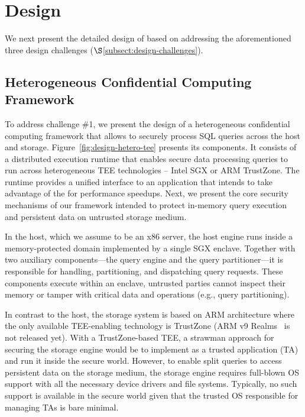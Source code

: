 \section{Design}
\label{sec:design}
We next present the detailed design of \project{} based on addressing the aforementioned three design challenges ($\S$\ref{subsect:design-challenges}).

\subsection{Heterogeneous Confidential Computing Framework}
\label{subsec:design-sef}

To address challenge \#1, we present the design of a heterogeneous confidential computing framework that allows to securely process SQL queries across the host and storage. Figure~\ref{fig:design-hetero-tee} presents its components. It consists of a distributed execution runtime that enables secure data processing queries to run across heterogeneous TEE technologies -- Intel SGX or ARM TrustZone. %
The runtime provides a unified interface to an application that intends to take advantage of the \csd for performance speedups. Next, we present the core security mechanisms of our framework intended to protect in-memory query execution and persistent data on untrusted storage medium. %

 In the host, which we assume to be an x86 server, the host engine runs inside a memory-protected domain implemented by a single SGX enclave. Together with two auxiliary components---the query engine and the query partitioner---it is responsible for handling, partitioning, and dispatching query requests. These components execute within an enclave, untrusted parties cannot inspect their memory or tamper with critical data and operations (e.g., query partitioning). %

In contrast to the host, the storage system is based on ARM architecture where the only available TEE-enabling technology is TrustZone (ARM v9 Realms~\cite{arm-cca} is not released yet). With a TrustZone-based TEE, a strawman approach for securing the storage engine would be to implement as a trusted application (TA) and run it inside the secure world. However, to enable split queries to access persistent data on the storage medium, the storage engine requires full-blown OS support with all the necessary device drivers and file systems. Typically, no such support is available in the secure world given that the trusted OS responsible for managing TAs is bare minimal.


